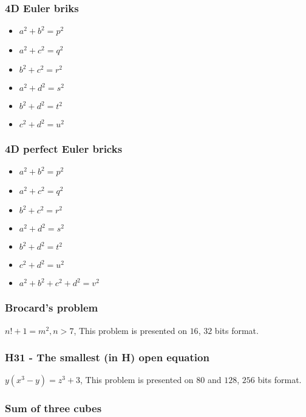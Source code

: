 \documentclass[conference]{IEEEtran}
\begin{document}
    \subsubsection{4D Euler briks}

    \begin{itemize}
        \item $a^2 + b^2 = p^2$
        \item $a^2 + c^2 = q^2$
        \item $b^2 + c^2 = r^2$
        \item $a^2 + d^2 = s^2$
        \item $b^2 + d^2 = t^2$
        \item $c^2 + d^2 = u^2$
    \end{itemize}

    \subsubsection{4D perfect Euler bricks}

    \begin{itemize}
        \item $a^2 + b^2 = p^2$
        \item $a^2 + c^2 = q^2$
        \item $b^2 + c^2 = r^2$
        \item $a^2 + d^2 = s^2$
        \item $b^2 + d^2 = t^2$
        \item $c^2 + d^2 = u^2$
        \item $a^2 + b^2 + c^2 + d^2 = v^2$
    \end{itemize}

    \subsubsection{Brocard's problem}

    $n!+1 = m^2, n > 7$, This problem is presented on $16$, $32$ bits format.

    \subsubsection{H31 - The smallest (in H) open equation \cite{b2}}

    $y(x^3 - y) = z^3 + 3$, This problem is presented on $80$ and $128$, $256$ bits format.

    \subsubsection{Sum of three cubes}
\end{document}
